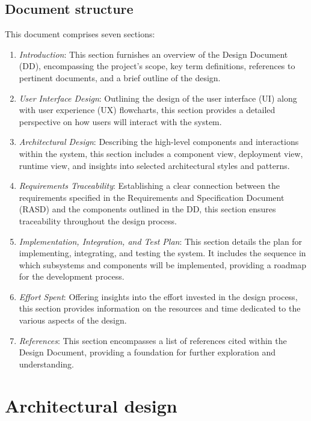 \documentclass[12pt, a4paper]{report}
\begin{document}
    \section{Document structure}
    This document comprises seven sections:

    \begin{enumerate}
        \item \textit{Introduction}: This section furnishes an overview of the Design Document (DD), encompassing the project's scope, key term definitions, references to pertinent documents, and a brief outline of the design. 
        \item \textit{User Interface Design}: Outlining the design of the user interface (UI) along with user experience (UX) flowcharts, this section provides a detailed perspective on how users will interact with the system. 
        \item \textit{Architectural Design}: Describing the high-level components and interactions within the system, this section includes a component view, deployment view, runtime view, and insights into selected architectural styles and patterns.
        \item \textit{Requirements Traceability}: Establishing a clear connection between the requirements specified in the Requirements and Specification Document (RASD) and the components outlined in the DD, this section ensures traceability throughout the design process.
        \item \textit{Implementation, Integration, and Test Plan}: This section details the plan for implementing, integrating, and testing the system. It includes the sequence in which subsystems and components will be implemented, providing a roadmap for the development process.
        \item \textit{Effort Spent}: Offering insights into the effort invested in the design process, this section provides information on the resources and time dedicated to the various aspects of the design.                 
        \item \textit{References}: This section encompasses a list of references cited within the Design Document, providing a foundation for further exploration and understanding.
    \end{enumerate}   
    
\newpage 

\chapter{Architectural design}
\end{document}
